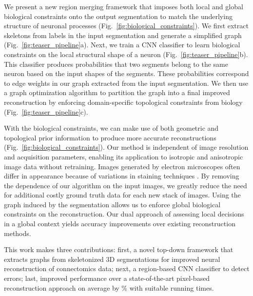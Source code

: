We present a new region merging framework that imposes both local and global biological constraints onto the output segmentation to match the underlying structure of neuronal processes (Fig.~\ref{fig:biological_constraints}).
We first extract skeletons from labels in the input segmentation and generate a simplified graph (Fig.~\ref{fig:teaser_pipeline}a). 
Next, we train a CNN classifier to learn biological constraints on the local structural shape of a neuron (Fig.~\ref{fig:teaser_pipeline}b).
This classifier produces probabilities that two segments belong to the same neuron based on the input shapes of the segments.
These probabilities correspond to edge weights in our graph extracted from the input segmentation.
We then use a graph optimization algorithm to partition the graph into a final improved reconstruction by enforcing domain-specific topological constraints from biology (Fig.~\ref{fig:teaser_pipeline}c).

With the biological constraints, we can make use of both geometric and topological prior information to produce more accurate reconstructions (Fig.~\ref{fig:biological_constraints}).
Our method is independent of image resolution and acquisition parameters, enabling its application to isotropic and anisotropic image data without retraining.
Images generated by electron microscopes often differ in appearance because of variations in staining techniques \cite{briggman2012volume}.
By removing the dependence of our algorithm on the input images, we greatly reduce the need for additional costly ground truth data for each new stack of images.
Using the graph induced by the segmentation allows us to enforce global biological constraints on the reconstruction. 
Our dual approach of assessing local decisions in a global context yields accuracy improvements over existing reconstruction methods.


This work makes three contributions:
first, a novel top-down framework that extracts graphs from skeletonized 3D segmentations for improved neural reconstruction of connectomics data; 
next, a region-based CNN classifier to detect errors; 
last, improved performance over a state-of-the-art pixel-based reconstruction approach on average by \% with suitable running times.
